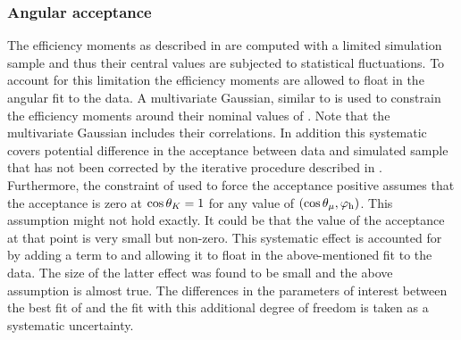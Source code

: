 \subsubsection{Angular acceptance}
\label{systAngAcc}
The efficiency moments as described in  are computed with a limited simulation sample
and thus their central values are subjected to statistical fluctuations. To account for this limitation the
efficiency moments are allowed to float in the angular fit to the data. A multivariate Gaussian, similar to 
is used to constrain the efficiency moments around their nominal values of .
Note that the multivariate Gaussian includes their correlations. In addition this systematic covers
potential difference in the acceptance between data and simulated sample
that has not been corrected by the iterative procedure described in . Furthermore,
the constraint of  used to force the acceptance positive assumes that the acceptance is zero
at $\cos\theta_{K}=1$ for any value of $(\cos\theta_{\mu},\varphi_{\rm h})$. This assumption might not hold exactly. It could be
that the value of the acceptance at that point is very small but non-zero. This systematic effect is accounted for
by adding a term to  and allowing it to float in the above-mentioned fit to the data.
The size of the latter effect was found to be small and the above assumption is almost true. The differences
in the parameters of interest between the best fit of  and the fit with this additional
degree of freedom is taken as a systematic uncertainty.

